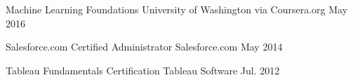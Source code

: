 




\begin{cvhonors}


\cvhonor
{Machine Learning Foundations} %
{University of Washington via Coursera.org} %
{May 2016} %
{} 


\cvhonor
{Salesforce.com Certified Administrator} %
{Salesforce.com} %
{May 2014} %
{} %


\cvhonor
{Tableau Fundamentals Certification} %
{Tableau Software} %
{Jul. 2012} %
{} %


\end{cvhonors}




